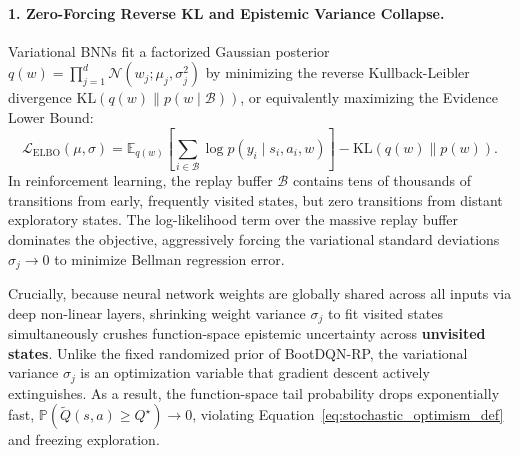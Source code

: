 \documentclass[10pt]{article}
\begin{document}
\paragraph{1. Zero-Forcing Reverse KL and Epistemic Variance Collapse.}
Variational BNNs fit a factorized Gaussian posterior $q(w) = \prod_{j=1}^d \mathcal{N}(w_j; \mu_j, \sigma_j^2)$ by minimizing the reverse Kullback-Leibler divergence $\text{KL}(q(w) \parallel p(w \mid \mathcal{B}))$, or equivalently maximizing the Evidence Lower Bound:
\begin{equation}
\mathcal{L}_{\text{ELBO}}(\mu, \sigma) = \mathbb{E}_{q(w)}\left[ \sum_{i \in \mathcal{B}} \log p(y_i \mid s_i, a_i, w) \right] - \text{KL}(q(w) \parallel p(w)).
\end{equation}
In reinforcement learning, the replay buffer $\mathcal{B}$ contains tens of thousands of transitions from early, frequently visited states, but zero transitions from distant exploratory states. The log-likelihood term over the massive replay buffer dominates the objective, aggressively forcing the variational standard deviations $\sigma_j \to 0$ to minimize Bellman regression error.

Crucially, because neural network weights are globally shared across all inputs via deep non-linear layers, shrinking weight variance $\sigma_j$ to fit visited states simultaneously crushes function-space epistemic uncertainty across \textbf{unvisited states}. Unlike the fixed randomized prior of BootDQN-RP, the variational variance $\sigma_j$ is an optimization variable that gradient descent actively extinguishes. As a result, the function-space tail probability drops exponentially fast, $\mathbb{P}(\tilde{Q}(s, a) \ge Q^\star) \to 0$, violating Equation~\eqref{eq:stochastic_optimism_def} and freezing exploration.
\end{document}
